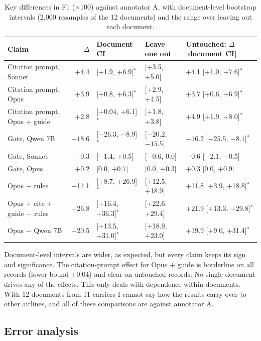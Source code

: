 \documentclass[11pt,a4paper]{article}
\newcommand{\sig}{$^{*}$}
\begin{document}
\begin{table}[h]
\centering
\footnotesize
\setlength{\tabcolsep}{4pt}
\begin{tabular}{lrlll}
\toprule
Claim & $\Delta$ & Document CI & Leave one out & Untouched: $\Delta$ [document CI] \\
\midrule
Citation prompt, Sonnet & +4.4 & [+1.9, +6.9]\sig & [+3.5, +5.0] & +4.1 [+1.0, +7.6]\sig \\
Citation prompt, Opus & +3.9 & [+0.8, +6.3]\sig & [+2.9, +4.5] & +3.7 [+0.6, +6.9]\sig \\
Citation prompt, Opus + guide & +2.8 & [+0.04, +6.1]\sig & [+1.8, +3.8] & +4.9 [+1.9, +8.0]\sig \\
Gate, Qwen 7B & $-18.6$ & [$-26.3$, $-8.9$]\sig & [$-20.2$, $-15.5$] & $-16.2$ [$-25.5$, $-8.1$]\sig \\
Gate, Sonnet & $-0.3$ & [$-1.4$, +0.5] & [$-0.6$, 0.0] & $-0.6$ [$-2.1$, +0.5] \\
Gate, Opus & +0.2 & [0.0, +0.7] & [0.0, +0.3] & +0.3 [0.0, +0.9] \\
Opus $-$ rules & +17.1 & [+8.7, +26.9]\sig & [+12.5, +18.9] & +11.8 [+3.9, +18.8]\sig \\
Opus + cite + guide $-$ rules & +26.8 & [+16.4, +36.3]\sig & [+22.6, +29.4] & +21.9 [+13.3, +29.8]\sig \\
Opus $-$ Qwen 7B & +20.5 & [+13.5, +31.0]\sig & [+18.9, +23.0] & +19.9 [+9.0, +31.4]\sig \\
\bottomrule
\end{tabular}
\caption{Key differences in F1 ($\times$100) against annotator A, with document-level bootstrap intervals (2,000 resamples of the 12 documents) and the range over leaving out each document.}
\label{tab:robust}
\end{table}

Document-level intervals are wider, as expected, but every claim keeps its sign and significance. The citation-prompt effect for Opus + guide is borderline on all records (lower bound +0.04) and clear on untouched records. No single document drives any of the effects. This only deals with dependence within documents. With 12 documents from 11 carriers I cannot say how the results carry over to other airlines, and all of these comparisons are against annotator A.

\subsection{Error analysis}
\end{document}
